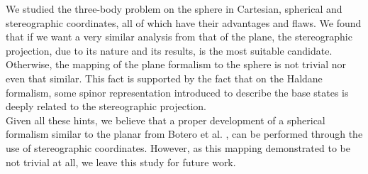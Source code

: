 We studied the three-body problem on the sphere in Cartesian, spherical and stereographic coordinates, all of which have their advantages and flaws. We found that if we want a very similar analysis from that of the plane, the stereographic projection, due to its nature and its results, is the most suitable candidate. Otherwise, the mapping of the plane formalism to the sphere is not trivial nor even that similar.  This fact is supported by the fact that on the Haldane formalism, some spinor representation introduced to describe the base states is deeply related to the stereographic projection.\\

Given all these hints, we believe that a proper development of a spherical formalism similar to the planar from Botero et al. \cite{alonso}, can be performed through the use of stereographic coordinates. However, as this mapping demonstrated to be not trivial at all, we leave this study for future work.\\


